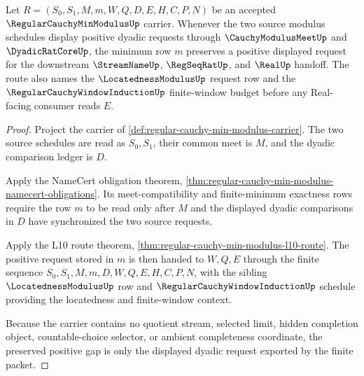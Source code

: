 \begin{theorem}
\label{thm:regular-cauchy-min-modulus-positive-gap}
Let $R=(S_0,S_1,M,m,W,Q,D,E,H,C,P,N)$ be an accepted $\RegularCauchyMinModulusUp$ carrier. Whenever the two source modulus schedules display positive dyadic requests through $\CauchyModulusMeetUp$ and $\DyadicRatCoreUp$, the minimum row $m$ preserves a positive displayed request for the downstream $\StreamNameUp$, $\RegSeqRatUp$, and $\RealUp$ handoff. The route also names the $\LocatednessModulusUp$ request row and the $\RegularCauchyWindowInductionUp$ finite-window budget before any Real-facing consumer reads $E$.
\end{theorem}
\begin{proof}
Project the carrier of \autoref{def:regular-cauchy-min-modulus-carrier}. The two source schedules are read as $S_0,S_1$, their common meet is $M$, and the dyadic comparison ledger is $D$.

Apply the NameCert obligation theorem, \autoref{thm:regular-cauchy-min-modulus-namecert-obligations}. Its meet-compatibility and finite-minimum exactness rows require the row $m$ to be read only after $M$ and the displayed dyadic comparisons in $D$ have synchronized the two source requests.

Apply the L10 route theorem, \autoref{thm:regular-cauchy-min-modulus-l10-route}. The positive request stored in $m$ is then handed to $W,Q,E$ through the finite sequence $S_0,S_1,M,m,D,W,Q,E,H,C,P,N$, with the sibling $\LocatednessModulusUp$ row and $\RegularCauchyWindowInductionUp$ schedule providing the locatedness and finite-window context.

Because the carrier contains no quotient stream, selected limit, hidden completion object, countable-choice selector, or ambient completeness coordinate, the preserved positive gap is only the displayed dyadic request exported by the finite packet.
\end{proof}

